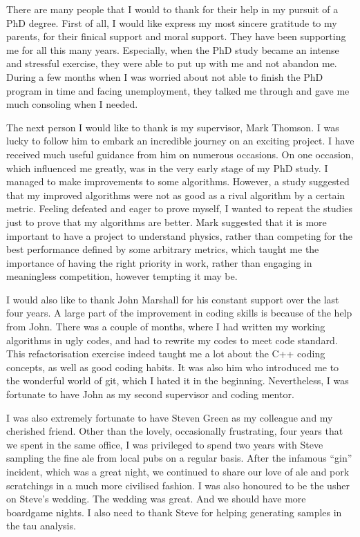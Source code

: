 \begin{acknowledgements}
There are many people that I would to thank  for their help in my pursuit of a PhD degree. First of all, I would like express my most sincere gratitude to my parents, for their finical support and moral support. They have been supporting me for all this many years. Especially, when the PhD study became an intense and stressful exercise, they were able to put up with me and not abandon me. During a few months when I was worried about not able to finish the PhD program in time and facing unemployment, they talked me through and gave me much consoling  when I needed.

The next person I would like to thank is my supervisor, Mark Thomson. I was lucky to follow him to embark an incredible journey on an exciting project. I have received much useful guidance from him on numerous occasions. On one occasion, which influenced me greatly, was in the very early stage of my PhD study. I managed to make improvements to some algorithms. However, a study suggested that my improved algorithms were not as good as a rival algorithm by a certain metric. Feeling defeated and eager to prove myself, I wanted to repeat the studies just to prove that my algorithms are better. Mark suggested that it is more important to have a project to understand physics, rather than competing for the best performance defined by some arbitrary metrics, which taught me the importance of having the right priority in work, rather than engaging in meaningless competition, however tempting it may be.

I would also like to thank John Marshall for his constant support over the last four years. A large part of the improvement in coding skills is because of the help from John. There was a couple of months, where I had written my working algorithms in ugly codes, and had to rewrite my codes to meet \pandora code standard. This refactorisation exercise indeed taught me a lot about the C++ coding concepts, as well as good coding habits. It was also him who introduced me to the wonderful world of git, which I hated it in the beginning. Nevertheless, I was fortunate to have John as my second supervisor and coding mentor.

I was also extremely fortunate to have Steven Green as my colleague and my cherished friend. Other than the lovely, occasionally frustrating, four years that we spent in the same office,   I was privileged to spend two years with Steve sampling the fine ale from local pubs on a regular basis. After the infamous ``gin'' incident, which was a great night, we continued to share our love of ale and pork scratchings in a much more civilised fashion. I was also honoured to be the usher on Steve's wedding. The wedding was great. And we should have more boardgame nights. I also need to thank Steve for helping generating samples in the tau analysis.


\end{acknowledgements}
